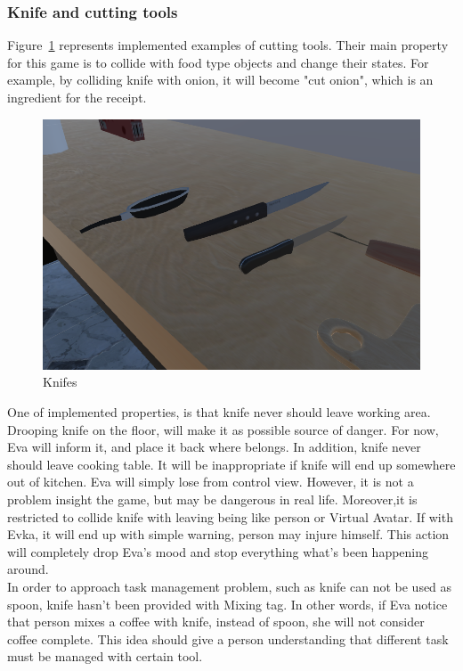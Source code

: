 \documentclass[18pt]{article}
\numberwithin{equation}{section} %
\numberwithin{figure}{section} %
\numberwithin{table}{section} %
\begin{document}
		\subsubsection{Knife and cutting tools}
			Figure~\ref{fig:knife_spoon} represents implemented examples of cutting tools. Their main property for this game is to collide with food type objects and change their states. For example, by colliding knife with onion, it will become "cut onion", which is an ingredient for the receipt. \\
				\begin{figure}[H]
					\centering
					\includegraphics[width=0.5\linewidth]{images/knife_spoon}
					\caption{Knifes}
					\label{fig:knife_spoon}
				\end{figure}
			One of implemented properties, is that knife never should leave working area. Drooping knife on the floor, will make it as possible source of danger. For now, Eva will inform it, and place it back where belongs. In addition, knife never should leave cooking table. It will be inappropriate if knife will end up somewhere out of kitchen. Eva will simply lose from control view. However, it is not a problem insight the game, but may be dangerous in real life. Moreover,it is restricted to collide knife with leaving being like person or Virtual Avatar. If with Evka, it will end up with simple warning, person may injure himself. This action will completely drop Eva's mood and stop everything what's been happening around. \\
			In order to approach task management problem, such as knife can not be used as spoon, knife hasn't been provided with Mixing tag. In other words, if Eva notice that person mixes a coffee with knife, instead of spoon, she will not consider coffee complete. This idea should give a person understanding that different task must be managed with certain tool. \\
			
\end{document}
